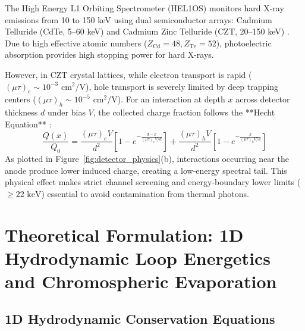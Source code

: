 \documentclass[11pt,a4paper,twocolumn]{article}
\newcommand{\helos}{HEL1OS}
\newcommand{\cdte}{CdTe}
\newcommand{\czt}{CZT}
\begin{document}
The High Energy L1 Orbiting Spectrometer (\helos) monitors hard X-ray emissions from 10 to 150 keV using dual semiconductor arrays: Cadmium Telluride (\cdte, 5--60 keV) and Cadmium Zinc Telluride (\czt, 20--150 keV) \citep{nandi2025hel1os,ravishankar2026hel1os}. Due to high effective atomic numbers ($Z_{\text{Cd}}=48, Z_{\text{Te}}=52$), photoelectric absorption provides high stopping power for hard X-rays.

However, in CZT crystal lattices, while electron transport is rapid ($(\mu\tau)_e \sim 10^{-3}\text{ cm}^2/\text{V}$), hole transport is severely limited by deep trapping centers ($(\mu\tau)_h \sim 10^{-5}\text{ cm}^2/\text{V}$). For an interaction at depth $x$ across detector thickness $d$ under bias $V$, the collected charge fraction follows the **Hecht Equation** \citep{hecht1932}:
\begin{equation}
\frac{Q(x)}{Q_0} = \frac{(\mu\tau)_e V}{d^2}\left[1 - e^{-\frac{d-x}{(\mu\tau)_e V / d}}\right] + \frac{(\mu\tau)_h V}{d^2}\left[1 - e^{-\frac{x}{(\mu\tau)_h V / d}}\right]
\label{eq:hecht}
\end{equation}
As plotted in Figure~\ref{fig:detector_physics}(b), interactions occurring near the anode produce lower induced charge, creating a low-energy spectral tail. This physical effect makes strict channel screening and energy-boundary lower limits ($\ge 22\text{ keV}$) essential to avoid contamination from thermal photons.

\section{Theoretical Formulation: 1D Hydrodynamic Loop Energetics and Chromospheric Evaporation}
\label{sec:theory}

\subsection{1D Hydrodynamic Conservation Equations}
\label{sec:hydro_eqs}
\end{document}
